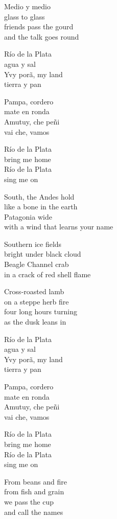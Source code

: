 \begin{lyrics}
Medio y medio\\
glass to glass\\
friends pass the gourd\\
and the talk goes round

Río de la Plata\\
agua y sal\\
Yvy porã, my land\\
tierra y pan

Pampa, cordero\\
mate en ronda\\
Amutuy, che peñi\\
vai che, vamos

Río de la Plata\\
bring me home\\
Río de la Plata\\
sing me on

South, the Andes hold\\
like a bone in the earth\\
Patagonia wide\\
with a wind that learns your name

Southern ice fields\\
bright under black cloud\\
Beagle Channel crab\\
in a crack of red shell flame

Cross-roasted lamb\\
on a steppe herb fire\\
four long hours turning\\
as the dusk leans in

Río de la Plata\\
agua y sal\\
Yvy porã, my land\\
tierra y pan

Pampa, cordero\\
mate en ronda\\
Amutuy, che peñi\\
vai che, vamos

Río de la Plata\\
bring me home\\
Río de la Plata\\
sing me on

From beans and fire\\
from fish and grain\\
we pass the cup\\
and call the names
\end{lyrics}

